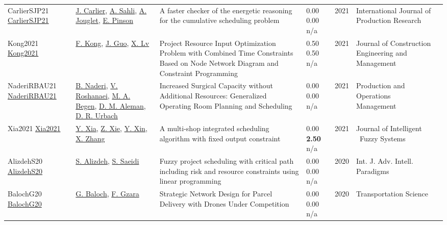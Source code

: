 {\begin{longtable}{p{3cm}p{5cm}p{10cm}p{1cm}rp{2.5cm}l}
CarlierSJP21 \href{http://dx.doi.org/10.1080/00207543.2021.1923853}{CarlierSJP21} & \hyperref[auth:a844]{J. Carlier}, \hyperref[auth:a927]{A. Sahli}, \hyperref[auth:a928]{A. Jouglet}, \hyperref[auth:a845]{E. Pinson} & A faster checker of the energetic reasoning for the cumulative scheduling problem & \noindent{}\textcolor{black!50}{0.00} \textcolor{black!50}{0.00} n/a & 2021 & \cellcolor{red!20}International Journal of Production Research & \cite{CarlierSJP21}\\
Kong2021 \href{http://dx.doi.org/10.1061/(asce)co.1943-7862.0002192}{Kong2021} & \hyperref[auth:a1704]{F. Kong}, \hyperref[auth:a1705]{J. Guo}, \hyperref[auth:a1706]{X. Lv} & Project Resource Input Optimization Problem with Combined Time Constraints Based on Node Network Diagram and Constraint Programming & \noindent{}0.50 0.50 n/a & 2021 & Journal of Construction Engineering and Management & \cite{Kong2021}\\
NaderiRBAU21 \href{http://dx.doi.org/10.1111/poms.13397}{NaderiRBAU21} & \hyperref[auth:a725]{B. Naderi}, \hyperref[auth:a727]{V. Roshanaei}, \hyperref[auth:a835]{M. A. Begen}, \hyperref[auth:a894]{D. M. Aleman}, \hyperref[auth:a895]{D. R. Urbach} & Increased Surgical Capacity without Additional Resources: Generalized Operating Room Planning and Scheduling & \noindent{}\textcolor{black!50}{0.00} \textcolor{black!50}{0.00} n/a & 2021 & \cellcolor{red!20}Production and Operations Management & \cite{NaderiRBAU21}\\
Xia2021 \href{http://dx.doi.org/10.3233/jifs-189721}{Xia2021} & \hyperref[auth:a1538]{Y. Xia}, \hyperref[auth:a1539]{Z. Xie}, \hyperref[auth:a1540]{Y. Xin}, \hyperref[auth:a1541]{X. Zhang} & A multi-shop integrated scheduling algorithm with fixed output constraint & \noindent{}\textcolor{black!50}{0.00} \textbf{2.50} n/a & 2021 & Journal of Intelligent \  Fuzzy Systems & \cite{Xia2021}\\
AlizdehS20 \href{https://doi.org/10.1504/IJAIP.2020.106687}{AlizdehS20} & \hyperref[auth:a512]{S. Alizdeh}, \hyperref[auth:a513]{S. Saeidi} & Fuzzy project scheduling with critical path including risk and resource constraints using linear programming & \noindent{}\textcolor{black!50}{0.00} \textcolor{black!50}{0.00} n/a & 2020 & \cellcolor{red!20}Int. J. Adv. Intell. Paradigms & \cite{AlizdehS20}\\
BalochG20 \href{http://dx.doi.org/10.1287/trsc.2019.0928}{BalochG20} & \hyperref[auth:a1236]{G. Baloch}, \hyperref[auth:a1237]{F. Gzara} & Strategic Network Design for Parcel Delivery with Drones Under Competition & \noindent{}\textcolor{black!50}{0.00} \textcolor{black!50}{0.00} n/a & 2020 & \cellcolor{red!20}Transportation Science & \cite{BalochG20}\\

\end{longtable}}
